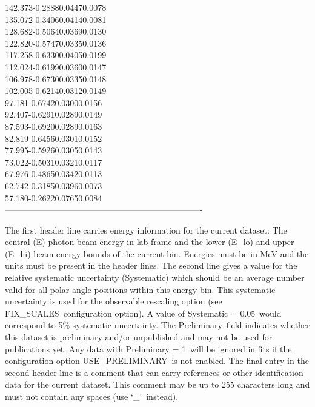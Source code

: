 \documentclass[a4paper,10pt]{article}
\def\bl{\phantom{0}}
\def\tt{\ttfamily}
\def\rm{\rmfamily}
\begin{document}
142.373\bl\bl\bl -0.2888\bl\bl\bl 0.0447\bl\bl\bl 0.0078\\
135.072\bl\bl\bl -0.3406\bl\bl\bl 0.0414\bl\bl\bl 0.0081\\
128.682\bl\bl\bl -0.5064\bl\bl\bl 0.0369\bl\bl\bl 0.0130\\
122.820\bl\bl\bl -0.5747\bl\bl\bl 0.0335\bl\bl\bl 0.0136\\
117.258\bl\bl\bl -0.6330\bl\bl\bl 0.0405\bl\bl\bl 0.0199\\
112.024\bl\bl\bl -0.6199\bl\bl\bl 0.0360\bl\bl\bl 0.0147\\
106.978\bl\bl\bl -0.6730\bl\bl\bl 0.0335\bl\bl\bl 0.0148\\
102.005\bl\bl\bl -0.6214\bl\bl\bl 0.0312\bl\bl\bl 0.0149\\
\phantom{1}97.181\bl\bl\bl -0.6742\bl\bl\bl 0.0300\bl\bl\bl 0.0156\\
\phantom{1}92.407\bl\bl\bl -0.6291\bl\bl\bl 0.0289\bl\bl\bl 0.0149\\
\phantom{1}87.593\bl\bl\bl -0.6920\bl\bl\bl 0.0289\bl\bl\bl 0.0163\\
\phantom{1}82.819\bl\bl\bl -0.6456\bl\bl\bl 0.0301\bl\bl\bl 0.0152\\
\phantom{1}77.995\bl\bl\bl -0.5926\bl\bl\bl 0.0305\bl\bl\bl 0.0143\\
\phantom{1}73.022\bl\bl\bl -0.5031\bl\bl\bl 0.0321\bl\bl\bl 0.0117\\
\phantom{1}67.976\bl\bl\bl -0.4865\bl\bl\bl 0.0342\bl\bl\bl 0.0113\\
\phantom{1}62.742\bl\bl\bl -0.3185\bl\bl\bl 0.0396\bl\bl\bl 0.0073\\
\phantom{1}57.180\bl\bl\bl -0.2622\bl\bl\bl 0.0765\bl\bl\bl 0.0084\\
----------------------------------------------------------------------\\
\rm

The first header line carries energy information for the current dataset: The central (\tt E\rm)
photon beam energy in lab frame and the lower (\tt E\_lo\rm)
and upper (\tt E\_hi\rm) beam energy bounds of the current bin. Energies must be in MeV and the units
must be present in the header lines.
The second line gives a value for the relative systematic uncertainty (\tt Systematic\rm)
which should be an average number valid for all polar angle positions within this energy bin. This systematic uncertainty
is used for the observable rescaling option (see \tt FIX\_SCALES\rm\ configuration option). A value of
\tt Systematic = 0.05\rm\ would correspond to 5\% systematic uncertainty. 
The \tt Preliminary\rm\ field indicates whether this dataset is preliminary and/or unpublished and may not be used
for publications yet. Any data with \tt Preliminary = 1\rm\ will be ignored in fits if the configuration
option \tt USE\_PRELIMINARY\rm\ is not enabled.
The final entry in the second header line is a comment that can carry references or other identification
data for the current dataset. This comment may be up to 255 characters long and must not contain any spaces 
(use `\tt \_\rm'\ instead).
\end{document}
